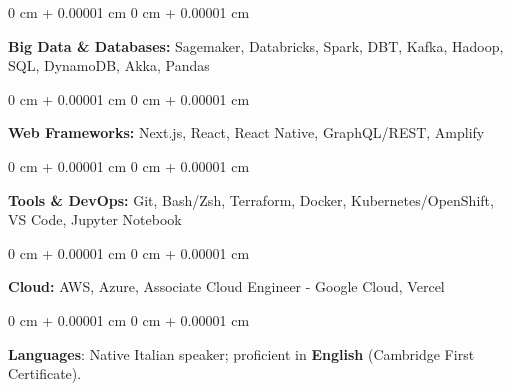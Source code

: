 \documentclass[10pt, letterpaper]{article}
\newenvironment{onecolentry}{
    \begin{adjustwidth}{
        0 cm + 0.00001 cm
    }{
        0 cm + 0.00001 cm
    }
}{
    \end{adjustwidth}
} %
\begin{document}
\vspace{0.2 cm}

\begin{onecolentry}
    \textbf{Big Data \& Databases:} Sagemaker, Databricks, Spark, DBT, Kafka, Hadoop, SQL, DynamoDB, Akka, Pandas
\end{onecolentry}

\vspace{0.2 cm}

\begin{onecolentry}
    \textbf{Web Frameworks:} Next.js, React, React Native, GraphQL/REST, Amplify
\end{onecolentry}

\vspace{0.2 cm}

\begin{onecolentry}
    \textbf{Tools \& DevOps:} Git, Bash/Zsh, Terraform, Docker, Kubernetes/OpenShift, VS Code, Jupyter Notebook
\end{onecolentry}

\vspace{0.2 cm}

\begin{onecolentry}
    \textbf{Cloud:} AWS, Azure, Associate Cloud Engineer - Google Cloud, Vercel
\end{onecolentry}

\begin{onecolentry}
    \textbf{Languages}: Native Italian speaker; proficient in \textbf{English} (Cambridge First Certificate).
\end{onecolentry}
    
\end{document}
